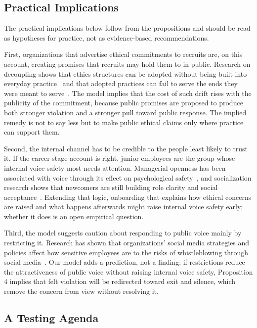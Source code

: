 \subsection{Practical Implications}

The practical implications below follow from the propositions and should be read as hypotheses for practice, not as evidence-based recommendations.

First, organizations that advertise ethical commitments to recruits are, on this account, creating promises that recruits may hold them to in public. Research on decoupling shows that ethics structures can be adopted without being built into everyday practice~\citep{weaver1999integrated} and that adopted practices can fail to serve the ends they were meant to serve~\citep{bromley2012smoke}. The model implies that the cost of such drift rises with the publicity of the commitment, because public promises are proposed to produce both stronger violation and a stronger pull toward public response. The implied remedy is not to say less but to make public ethical claims only where practice can support them.

Second, the internal channel has to be credible to the people least likely to trust it. If the career-stage account is right, junior employees are the group whose internal voice safety most needs attention. Managerial openness has been associated with voice through its effect on psychological safety~\citep{detert2007leadership}, and socialization research shows that newcomers are still building role clarity and social acceptance~\citep{bauer2007newcomer}. Extending that logic, onboarding that explains how ethical concerns are raised and what happens afterwards might raise internal voice safety early; whether it does is an open empirical question.

Third, the model suggests caution about responding to public voice mainly by restricting it. Research has shown that organizations' social media strategies and policies affect how sensitive employees are to the risks of whistleblowing through social media~\citep{xiao2022employee}. Our model adds a prediction, not a finding: if restrictions reduce the attractiveness of public voice without raising internal voice safety, Proposition 4 implies that felt violation will be redirected toward exit and silence, which remove the concern from view without resolving it.

\subsection{A Testing Agenda}

